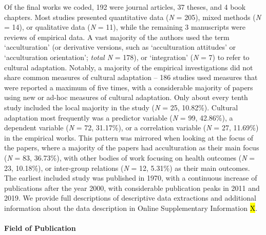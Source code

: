 

Of the final works we coded, 192 were journal articles, 37 theses, and 4
book chapters. Most studies presented quantitative data (\textit{N} =
205), mixed methods (\textit{N} = 14), or qualitative data (\textit{N} =
11), while the remaining 3 manuscripts were reviews of empirical data. A
vast majority of the authors used the term `acculturation' (or
derivative versions, such as `acculturation attitudes' or `acculturation
orientation'; \textit{total N} = 178), or `integration' (\textit{N} = 7)
to refer to cultural adaptation. Notably, a majority of the empirical
investigations did not share common measures of cultural adaptation --
186 studies used measures that were reported a maximum of five times,
with a considerable majority of papers using new or ad-hoc measures of
cultural adaptation. Only about every tenth study included the local
majority in the study (\textit{N} = 25, 10.82\%). Cultural adaptation
most frequently was a predictor variable (\textit{N} = 99, 42.86\%), a
dependent variable (\textit{N} = 72, 31.17\%), or a correlation variable
(\textit{N} = 27, 11.69\%) in the empirical works. This pattern was
mirrored when looking at the focus of the papers, where a majority of
the papers had acculturation as their main focus (\textit{N} = 83,
36.73\%), with other bodies of work focusing on health outcomes
(\textit{N} = 23, 10.18\%), or inter-group relations (\textit{N} = 12,
5.31\%) as their main outcomes. The earliest included study was
published in 1970, with a continuous increase of publications after the
year 2000, with considerable publication peaks in 2011 and 2019. We
provide full descriptions of descriptive data extractions and additional
information about the data description in Online Supplementary
Information \hl{X}.

\paragraph{Field of Publication}

